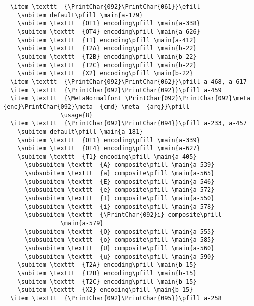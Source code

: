 \documentclass[twoside]{ltxdoc}
\makeatletter
\renewenvironment{theindex}{%
   \@restonecoltrue
   \if@twocolumn\@restonecolfalse\fi
   \columnseprule \z@
   \columnsep 35\p@
   \twocolumn[\index@prologue]%
   \IndexParms
   \let\item\@idxitem
   \ignorespaces
}{\if@restonecol\onecolumn\else\clearpage\fi}
\makeatother
\begin{document}
\begin{theindex}
\begin{figure*}
    \let\item=\listenvironmentitem
    \expandafter\def \expandafter\MacroFont \expandafter{%
       \MacroFont\footnotesize}
    \begin{list}{}{\setlength{\leftmargin}{-0.5\marginparwidth}}
    \item[]
\begin{verbatim}
  \item \texttt  {\PrintChar{092}\PrintChar{061}}\efill 
    \subitem default\pfill \main{a-179}
    \subitem \texttt  {OT1} encoding\pfill \main{a-338}
    \subitem \texttt  {OT4} encoding\pfill \main{a-626}
    \subitem \texttt  {T1} encoding\pfill \main{a-412}
    \subitem \texttt  {T2A} encoding\pfill \main{b-22}
    \subitem \texttt  {T2B} encoding\pfill \main{b-22}
    \subitem \texttt  {T2C} encoding\pfill \main{b-22}
    \subitem \texttt  {X2} encoding\pfill \main{b-22}
  \item \texttt  {\PrintChar{092}\PrintChar{062}}\pfill a-468, a-617
  \item \texttt  {\PrintChar{092}\PrintChar{092}}\pfill a-459
  \item \texttt  {\MetaNormalfont \PrintChar{092}\PrintChar{092}\meta  {enc}\PrintChar{092}\meta  {cmd}-\meta  {arg}}\pfill 
                \usage{8}
  \item \texttt  {\PrintChar{092}\PrintChar{094}}\pfill a-233, a-457
    \subitem default\pfill \main{a-181}
    \subitem \texttt  {OT1} encoding\pfill \main{a-339}
    \subitem \texttt  {OT4} encoding\pfill \main{a-627}
    \subitem \texttt  {T1} encoding\pfill \main{a-405}
      \subsubitem \texttt  {A} composite\pfill \main{a-539}
      \subsubitem \texttt  {a} composite\pfill \main{a-565}
      \subsubitem \texttt  {E} composite\pfill \main{a-546}
      \subsubitem \texttt  {e} composite\pfill \main{a-572}
      \subsubitem \texttt  {I} composite\pfill \main{a-550}
      \subsubitem \texttt  {i} composite\pfill \main{a-578}
      \subsubitem \texttt  {\PrintChar{092}i} composite\pfill 
                \main{a-579}
      \subsubitem \texttt  {O} composite\pfill \main{a-555}
      \subsubitem \texttt  {o} composite\pfill \main{a-585}
      \subsubitem \texttt  {U} composite\pfill \main{a-560}
      \subsubitem \texttt  {u} composite\pfill \main{a-590}
    \subitem \texttt  {T2A} encoding\pfill \main{b-15}
    \subitem \texttt  {T2B} encoding\pfill \main{b-15}
    \subitem \texttt  {T2C} encoding\pfill \main{b-15}
    \subitem \texttt  {X2} encoding\pfill \main{b-15}
  \item \texttt  {\PrintChar{092}\PrintChar{095}}\pfill a-258

\end{verbatim}
\end{list}
\end{figure*}
\end{theindex}
\end{document}
